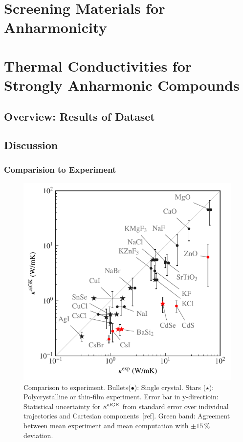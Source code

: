 \documentclass[nobib,a4paper,twoside,notoc,justified,marginals=justified]{tufte-book}
\begin{document}

\chapter{Screening Materials for Anharmonicity}


\chapter{Thermal Conductivities for Strongly Anharmonic Compounds}
\section{Overview: Results of Dataset}
\section{Discussion}
\subsection{Comparision to Experiment}

\begin{figure}
	\includegraphics[width=\textwidth]{./plots/kappa_vs_exp/kappa_vs_exp.pdf}
	\caption{Comparison to experiment. Bullets($\bullet$): Single crystal. Stars ($\star$): Polycrystalline or thin-film experiment. Error bar in y-directioin: Statistical uncertainty for $\kappa^{\rm aiGK}$ from standard error over individual trajectories and Cartesian components~[ref]. Green band: Agreement between mean experiment and mean computation with $\pm 15\,\%$ deviation.}
	\label{fig:kappa_exp}
\end{figure}
\end{document}

